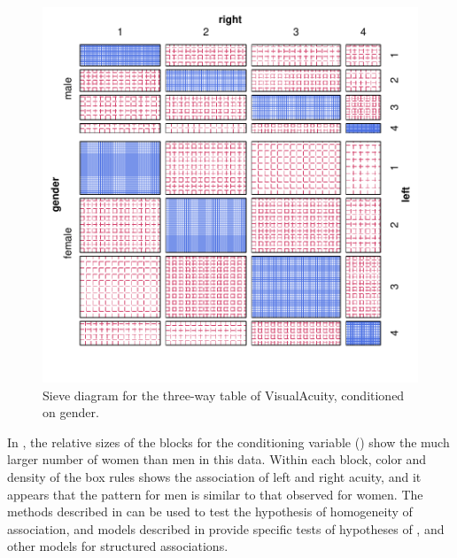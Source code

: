 \documentclass[11pt]{book}
\renewenvironment{knitrout}{\small\renewcommand{\baselinestretch}{.85}}{} %
\begin{document}
\begin{knitrout}
\color{fgcolor}\begin{kframe}
\begin{alltt}
 \hlopt{~}  \hlopt{+}  \hlopt{|}     \hlstd{=}\hlstd{)}
\end{alltt}
\end{kframe}\begin{figure}[!htbp]


\centerline{\includegraphics[width=.7\textwidth]{ch04/fig/VA-sieve3} }

\caption[Sieve diagram for the three-way table of VisualAcuity, conditioned on gender]{Sieve diagram for the three-way table of VisualAcuity, conditioned on gender.\label{fig:VA-sieve3}}
\end{figure}


\end{knitrout}

In , the relative sizes of the blocks for the conditioning
variable () show the much larger number of women than men in
this data.  Within each block, color and density of the box rules shows the 
association of left and right acuity, and it appears that the pattern
for men is similar to that observed for women.  
The methods described in  can be used to test
the hypothesis of homogeneity of association, and 
\loglin models described in  provide 
specific tests of hypotheses of ,
 and other models for structured associations.
\end{document}
